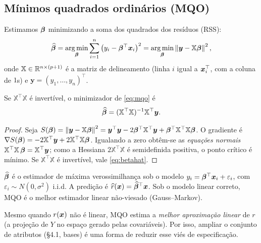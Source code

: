 \documentclass[11pt,a4paper]{article}
\begin{document}
\subsection{Mínimos quadrados ordinários (MQO)}
Estimamos $\bm{\beta}$ minimizando a soma dos quadrados dos resíduos (RSS):
\begin{equation}\label{eq:mqo}
  \widehat{\bbeta}
   = \argmin_{\bbeta} \sum_{i=1}^n
     \big(y_i - \bbeta^\top \x_i\big)^2
   = \argmin_{\bbeta} \norm{\bm{y} - \mathbb{X}\bbeta}^2 ,
\end{equation}
onde $\mathbb{X}\in\mathbb{R}^{n\times(p+1)}$ é a matriz de delineamento (linha $i$ igual a
$\bm{x}_i^\top$, com a coluna de $1$s) e $\bm{y}=(y_1,\dots,y_n)^\top$.

\begin{proposicao}\label{prop:normal}
Se $\mathbb{X}^\top\mathbb{X}$ é invertível, o minimizador de \eqref{eq:mqo} é
\begin{equation}\label{eq:betahat}
  \widehat{\bm{\beta}} = (\mathbb{X}^\top\mathbb{X})^{-1}\mathbb{X}^\top \bm{y}.
\end{equation}
\end{proposicao}
\begin{proof}
Seja $S(\bm{\beta})=\left\lVert \bm{y}-\mathbb{X}\bm{\beta} \right\rVert^2
=\bm{y}^\top\bm{y}-2\bm{\beta}^\top\mathbb{X}^\top\bm{y}+\bm{\beta}^\top\mathbb{X}^\top\mathbb{X}\bm{\beta}$.
O gradiente é $\nabla S(\bm{\beta})=-2\mathbb{X}^\top\bm{y}+2\mathbb{X}^\top\mathbb{X}\bm{\beta}$.
Igualando a zero obtêm-se as \emph{equações normais}
$\mathbb{X}^\top\mathbb{X}\,\bm{\beta}=\mathbb{X}^\top\bm{y}$; como a Hessiana
$2\mathbb{X}^\top\mathbb{X}$ é semidefinida positiva, o ponto crítico é mínimo. Se
$\mathbb{X}^\top\mathbb{X}$ é invertível, vale \eqref{eq:betahat}.
\end{proof}

\begin{observacao}
$\widehat{\bm{\beta}}$ é o estimador de máxima verossimilhança sob o modelo
$y_i = \bm{\beta}^\top\bm{x}_i + \varepsilon_i$, com $\varepsilon_i\sim N(0,\sigma^2)$
i.i.d. A predição é $\widehat{r}(\bm{x})=\widehat{\bm{\beta}}^\top\bm{x}$. Sob o modelo linear
correto, MQO é o melhor estimador linear não-viesado (Gauss--Markov).
\end{observacao}

\begin{observacao}
Mesmo quando $r(\bm{x})$ não é linear, MQO estima a \emph{melhor aproximação linear} de
$r$ (a projeção de $Y$ no espaço gerado pelas covariáveis). Por isso, ampliar o
conjunto de atributos (§4.1, bases) é uma forma de reduzir esse viés de
especificação.
\end{observacao}
\end{document}
